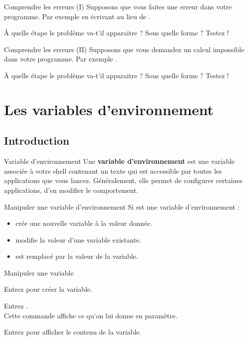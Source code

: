 \documentclass[a4paper,11pt]{style-esi/td}
\begin{document}
	\begin{Exercice}{Comprendre les erreurs (I)}
		Supposons que vous faites une erreur dans votre programme.
		Par exemple en écrivant  
		au lieu de .

		À quelle étape le problème va-t'il apparaitre ?
		Sous quelle forme ? Testez !
	\end{Exercice}

	\begin{Exercice}{Comprendre les erreurs (II)}
		Supposons que vous demandez un calcul impossible dans votre programme.
		Par exemple .

		À quelle étape le problème va-t'il apparaitre ?
		Sous quelle forme ? Testez !
	\end{Exercice}

\section{Les variables d'environnement}  

	\subsection{Introduction}

		\begin{theorie}{Variable d'environnement}
			Une \textbf{variable d'environnement} 
			est une variable associée à votre shell 
			contenant un texte qui est accessible 
			par toutes les applications que vous lancez. 
			Généralement, elle permet de configurer certaines applications, 
			d'en modifier le comportement.
		\end{theorie}	

		\begin{theorie}{Manipuler une variable d'environnement}
			Si  est une variable d'environnement :
			\begin{itemize}
			\item {} crée une nouvelle variable à la valeur donnée.
			\item {} modifie la valeur d'une variable existante.
			\item {} est remplacé par la valeur de la variable.
			\end{itemize}
		\end{theorie}

		\begin{Experience}{Manipuler une variable}
			\begin{steps}
			\item Entrez  pour créer la variable.
			\item Entrez .
				\\Cette commande affiche ce qu'on lui donne en paramètre.
			\item Entrez  pour afficher le contenu de la variable.
			\end{steps}
		\end{Experience}
\end{document}
